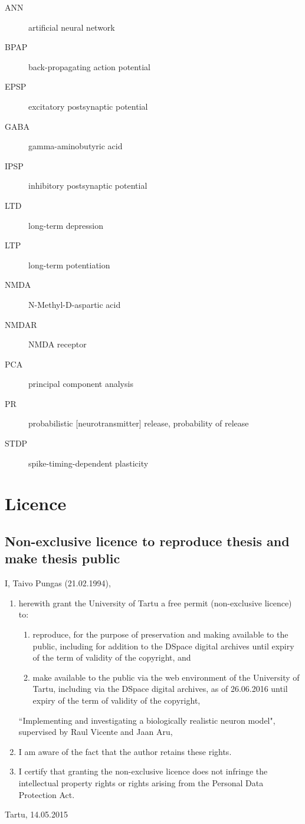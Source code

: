\documentclass[a4paper,12pt]{report}
\theoremstyle{definition}
\newcommand{\thesistitle}{Implementing and investigating a biologically realistic neuron model} %
\begin{document}
\begin{description}
  \item[ANN] artificial neural network
  \item[BPAP] back-propagating action potential
  \item[EPSP] excitatory postsynaptic potential
  \item[GABA] gamma-aminobutyric acid
  \item[IPSP] inhibitory postsynaptic potential
  \item[LTD] long-term depression
  \item[LTP] long-term potentiation
  \item[NMDA] N-Methyl-D-aspartic acid
  \item[NMDAR] NMDA receptor
  \item[PCA] principal component analysis
  \item[PR] probabilistic [neurotransmitter] release, probability of release
  \item[STDP] spike-timing-dependent plasticity
\end{description}





\chapter*{Licence}

\section*{Non-exclusive licence to reproduce thesis and make thesis public}
I, Taivo Pungas (21.02.1994), 
\begin{enumerate}
	\item herewith grant the University of Tartu a free permit (non-exclusive licence) to:
	\begin{enumerate}[label*=\arabic*.]
		\renewcommand{\theenumi}{\arabic{enumi}}
		\item reproduce, for the purpose of preservation and making available to the public, including for addition to the DSpace digital archives until expiry of the term of validity of the copyright, and
		\item make available to the public via the web environment of the University of Tartu, including via the DSpace digital archives, as of 26.06.2016 until expiry of the term of validity of the copyright,
	\end{enumerate}
	``\thesistitle", supervised by Raul Vicente and Jaan Aru,
	
	\item I am aware of the fact that the author retains these rights.

	\item I certify that granting the non-exclusive licence does not infringe the intellectual property rights or rights arising from the Personal Data Protection Act. 
\end{enumerate}

Tartu, 14.05.2015

\thispagestyle{empty}
\newpage
\end{document}
